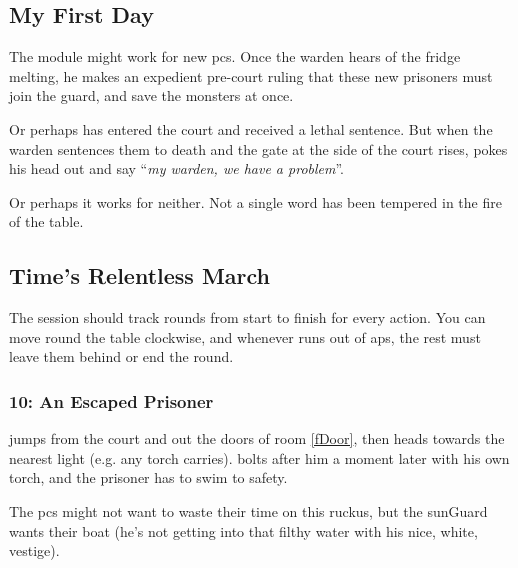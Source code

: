 \subsection{My First Day}

The module might work for new \glspl{pc}.
Once the \gls{warden} hears of the fridge melting, he makes an expedient pre-court ruling that these new prisoners must join the \gls{guard}, and save the \glspl{monster} at once.

Or perhaps  has entered the \gls{court} and received a lethal sentence.
But when the \gls{warden} sentences them to death and the gate at the side of the \gls{court} rises,  pokes his head out and say ``\textit{my \gls{warden}, we have a problem}''.

Or perhaps it works for neither.
Not a single word has been tempered in the fire of the table.

\subsection{Time's Relentless March}

The session should track \glspl{round} from start to finish for every \gls{action}.
You can move round the table clockwise, and whenever  runs out of \glspl{ap}, the rest must leave them behind or end the \gls{round}.

\subsubsection[An Escaped Prisoner]{10: An Escaped Prisoner}
jumps from the \gls{court} and out the doors of room \vref{fDoor}, then heads towards the nearest light (e.g. any \gls{torch}  carries).
 bolts after him a moment later with his own \gls{torch}, and the prisoner has to swim to safety.

The \glspl{pc} might not want to waste their time on this ruckus, but the \gls{sunGuard} wants their boat (he's not getting into that filthy water with his nice, white, vestige).



